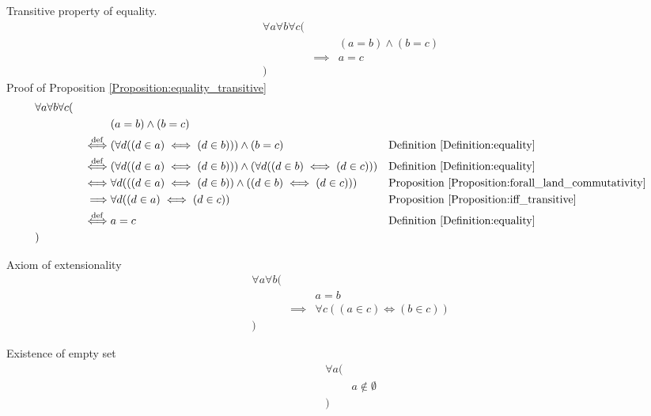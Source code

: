 \begin{prop}
\label{Proposition:equality_transitive}
Transitive property of equality.
\begin{align*}
& \forall a \forall b \forall c ( \\
& & & (a = b) \land (b = c) \\
& & \implies & a = c \\
& )
\end{align*}
Proof of Proposition \ref{Proposition:equality_transitive}
\begin{align*}
& \forall a \forall b \forall c ( \\
& & & (a = b) \land (b = c) \\
& & \overset{\operatorname{def}}{\iff} & (\forall d ((d \in a) \iff (d \in b))) \land (b = c)
&& \text{Definition \ref{Definition:equality}} \\
& & \overset{\operatorname{def}}{\iff} & (\forall d ((d \in a) \iff (d \in b))) \land (\forall d ((d \in b) \iff (d \in c)))
&& \text{Definition \ref{Definition:equality}} \\
& & \iff & \forall d (((d \in a) \iff (d \in b)) \land ((d \in b) \iff (d \in c)))
&& \text{Proposition \ref{Proposition:forall_land_commutativity}} \\
& & \implies & \forall d ((d \in a) \iff (d \in c))
&& \text{Proposition \ref{Proposition:iff_transitive}} \\
& & \overset{\operatorname{def}}{\iff} & a = c
&& \text{Definition \ref{Definition:equality}} \\
& )
\end{align*}
\end{prop}

\begin{axm}
\label{Axiom:extensionality}
Axiom of extensionality
\begin{align*}
& \forall a \forall b ( \\
& & & a = b \\
& & \implies & \forall c ((a \in c) \iff (b \in c)) \\
& )
\end{align*}
\end{axm}

\begin{axm}
\label{Axiom:existence_of_empty_set}
Existence of empty set
\begin{align*}
& \forall a ( \\
& & a \notin \emptyset \\
& )
\end{align*}
\end{axm}

